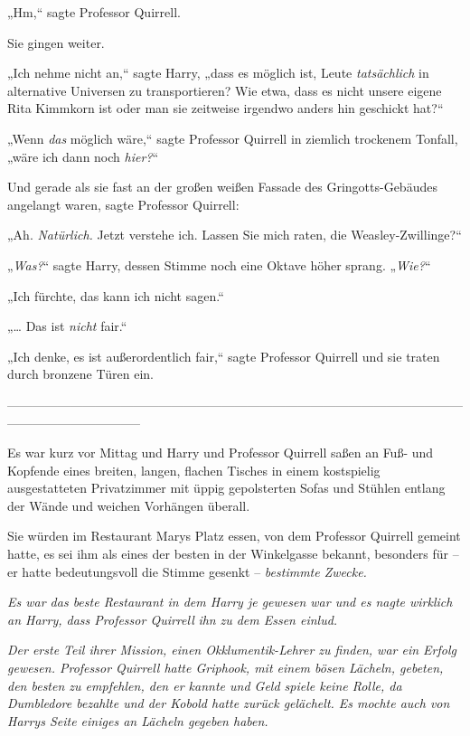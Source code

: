 {„Hm,“ sagte Professor Quirrell.

Sie gingen weiter.

„Ich nehme nicht an,“ sagte Harry, „dass es möglich ist, Leute \emph{tatsächlich} in alternative Universen zu transportieren? Wie etwa, dass es nicht unsere eigene Rita Kimmkorn ist oder man sie zeitweise irgendwo anders hin geschickt hat?“

„Wenn \emph{das} möglich wäre,“ sagte Professor Quirrell in ziemlich trockenem Tonfall, „wäre ich dann noch \emph{hier?}“

Und gerade als sie fast an der großen weißen Fassade des Gringotts-Gebäudes angelangt waren, sagte Professor Quirrell:

„Ah. \emph{Natürlich.} Jetzt verstehe ich. Lassen Sie mich raten, die Weasley-Zwillinge?“

„\emph{Was?}“ sagte Harry, dessen Stimme noch eine Oktave höher sprang. „\emph{Wie?}“

„Ich fürchte, das kann ich nicht sagen.“

„… Das ist \emph{nicht} fair.“

„Ich denke, es ist außerordentlich fair,“ sagte Professor Quirrell und sie traten durch bronzene Türen ein.

--------------------------------------------------------------------------------------------------------------------------------------------

Es war kurz vor Mittag und Harry und Professor Quirrell saßen an Fuß- und Kopfende eines breiten, langen, flachen Tisches in einem kostspielig ausgestatteten Privatzimmer mit üppig gepolsterten Sofas und Stühlen entlang der Wände und weichen Vorhängen überall.

Sie würden im Restaurant Marys Platz essen, von dem Professor Quirrell gemeint hatte, es sei ihm als eines der besten in der Winkelgasse bekannt, besonders für -- er hatte bedeutungsvoll die Stimme gesenkt -- \emph{bestimmte Zwecke.}

\emph{Es war das beste Restaurant in dem Harry je gewesen war und es nagte wirklich an Harry, dass Professor Quirrell} \emph{\emph{ihn}} \emph{zu dem Essen einlud.}

\emph{Der erste Teil ihrer Mission, einen Okklumentik-Lehrer zu finden, war ein Erfolg gewesen. Professor Quirrell hatte Griphook, mit einem bösen Lächeln, gebeten, den besten zu empfehlen, den er kannte und Geld spiele keine Rolle, da Dumbledore bezahlte und der Kobold hatte zurück gelächelt. Es mochte auch von Harrys Seite einiges an Lächeln gegeben haben.}

}
